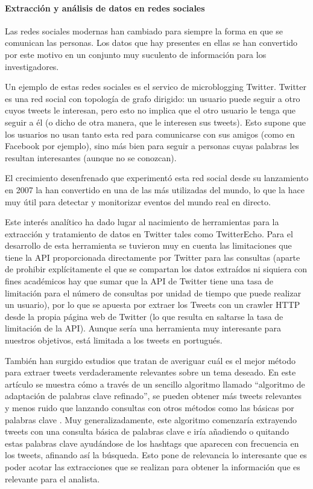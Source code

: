 \paragraph{Extracción y análisis de datos en redes sociales}
Las redes sociales modernas han cambiado para siempre la forma en que se comunican las personas. Los datos que hay presentes en ellas se han convertido por este motivo en un conjunto muy suculento de información para los investigadores. 

Un ejemplo de estas redes sociales es el servico de microblogging Twitter. Twitter es una red social con topología de grafo dirigido: un usuario puede seguir a otro cuyos tweets le interesan, pero esto no implica que el otro usuario le tenga que seguir a él (o dicho de otra manera, que le interesen sus tweets). Esto supone que los usuarios no usan tanto esta red para comunicarse con  sus amigos (como en Facebook por ejemplo), sino más bien para seguir a personas cuyas palabras les resultan interesantes (aunque no se conozcan).

El crecimiento desenfrenado que experimentó esta red social desde su lanzamiento en 2007 la han convertido en una de las más utilizadas del mundo, lo que la hace muy útil para detectar y monitorizar eventos del mundo real en directo.

Este interés analítico ha dado lugar al nacimiento de herramientas para la extracción y tratamiento de datos en Twitter tales como TwitterEcho. Para el desarrollo de esta herramienta se tuvieron muy en cuenta las limitaciones que tiene la API proporcionada directamente por Twitter para las consultas (aparte de prohibir explícitamente el que se compartan los datos extraídos ni siquiera con fines académicos hay que sumar que la API de Twitter tiene una tasa de limitación para el número de consultas por unidad de tiempo que puede realizar un usuario), por lo que se apuesta por extraer los Tweets con un crawler HTTP desde la propia página web de Twitter (lo que resulta en saltarse la tasa de limitación de la API). Aunque sería una herramienta muy interesante para nuestros objetivos, está limitada a los tweets en portugués.

También han surgido estudios que tratan de averiguar cuál es el mejor método para extraer tweets verdaderamente relevantes sobre un tema deseado. En este artículo se muestra cómo a través de un sencillo algoritmo llamado ``algoritmo de adaptación de palabras clave refinado'', se pueden obtener más tweets relevantes y menos ruido que lanzando consultas con otros métodos como las básicas por palabras clave . Muy generalizadamente, este algoritmo comenzaría extrayendo tweets con una consulta básica de palabras clave e iría añadiendo o quitando estas palabras clave ayudándose de los hashtags que aparecen con frecuencia en los tweets, afinando así la búsqueda. Esto pone de relevancia lo interesante que es poder acotar las extracciones que se realizan para obtener la información que es relevante para el analista.

